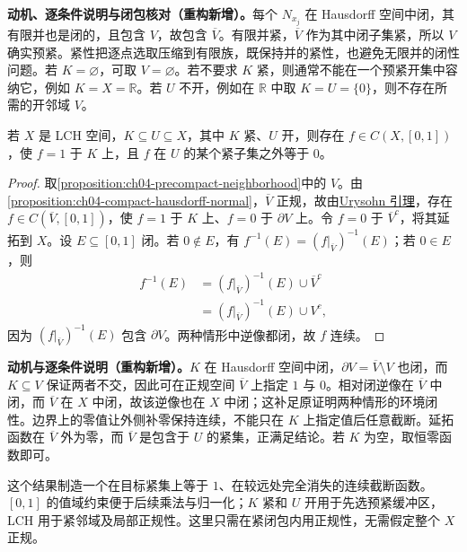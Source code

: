 \documentclass[../../main.tex]{subfiles}%
\begin{document}
\begin{remark}
\textbf{动机、逐条件说明与闭包核对（重构新增）。}每个 $N_{x_j}$ 在 Hausdorff 空间中闭，其有限并也是闭的，且包含 $V$，故包含 $\overline V$。有限并紧，$\overline V$ 作为其中闭子集紧，所以 $V$ 确实预紧。紧性把逐点选取压缩到有限族，既保持并的紧性，也避免无限并的闭性问题。若 $K=\varnothing$，可取 $V=\varnothing$。若不要求 $K$ 紧，则通常不能在一个预紧开集中容纳它，例如 $K=X=\mathbb R$。若 $U$ 不开，例如在 $\mathbb R$ 中取 $K=U=\{0\}$，则不存在所需的开邻域 $V$。
\end{remark}
\begin{theorem}\label{theorem:ch04-local-urysohn}
若 $X$ 是 LCH 空间，$K\subseteq U\subseteq X$，其中 $K$ 紧、$U$ 开，则存在 $f\in C(X,[0,1])$，使 $f=1$ 于 $K$ 上，且 $f$ 在 $U$ 的某个紧子集之外等于 $0$。
\end{theorem}
\begin{proof}
取\cref{proposition:ch04-precompact-neighborhood}中的 $V$。由\cref{proposition:ch04-compact-hausdorff-normal}，$\overline V$ 正规，故由\hyperref[lemma:ch04-urysohn]{Urysohn 引理}，存在 $f\in C(\overline V,[0,1])$，使 $f=1$ 于 $K$ 上、$f=0$ 于 $\partial V$ 上。令 $f=0$ 于 $\overline V^c$，将其延拓到 $X$。设 $E\subseteq[0,1]$ 闭。若 $0\notin E$，有 $f^{-1}(E)=(f|_{\overline V})^{-1}(E)$；若 $0\in E$，则
\begin{align*}
f^{-1}(E)&=(f|_{\overline V})^{-1}(E)\cup\overline V^c\\
&=(f|_{\overline V})^{-1}(E)\cup V^c,
\end{align*}
因为 $(f|_{\overline V})^{-1}(E)$ 包含 $\partial V$。两种情形中逆像都闭，故 $f$ 连续。
\end{proof}
\begin{remark}
\textbf{动机与逐条件说明（重构新增）。}$K$ 在 Hausdorff 空间中闭，$\partial V=\overline V\setminus V$ 也闭，而 $K\subseteq V$ 保证两者不交，因此可在正规空间 $\overline V$ 上指定 $1$ 与 $0$。相对闭逆像在 $\overline V$ 中闭，而 $\overline V$ 在 $X$ 中闭，故该逆像也在 $X$ 中闭；这补足原证明两种情形的环境闭性。边界上的零值让外侧补零保持连续，不能只在 $K$ 上指定值后任意截断。延拓函数在 $\overline V$ 外为零，而 $\overline V$ 是包含于 $U$ 的紧集，正满足结论。若 $K$ 为空，取恒零函数即可。

这个结果制造一个在目标紧集上等于 $1$、在较远处完全消失的连续截断函数。$[0,1]$ 的值域约束便于后续乘法与归一化；$K$ 紧和 $U$ 开用于先选预紧缓冲区，LCH 用于紧邻域及局部正规性。这里只需在紧闭包内用正规性，无需假定整个 $X$ 正规。
\end{remark}
\end{document}
